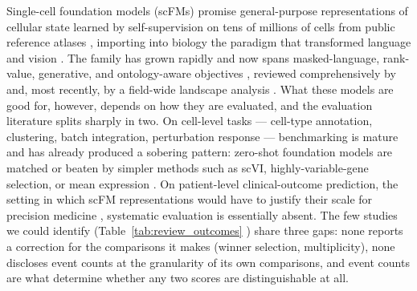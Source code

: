 \documentclass[11pt,a4paper]{article}
\begin{document}
Single-cell foundation models (scFMs) promise general-purpose representations
of cellular state learned by self-supervision on tens of millions of cells
from public reference atlases \citep{cui2024scgpt, theodoris2023geneformer,
regev2017hca, tabula2022sapiens, czi2025cellxgene}, importing into biology the
paradigm that transformed language and vision \citep{bommasani2021foundation,
moor2023generalist, bunne2024virtualcell}. The family has grown rapidly and
now spans masked-language, rank-value, generative, and ontology-aware
objectives \citep{cui2024scgpt, theodoris2023geneformer, hao2024scfoundation,
wen2024cellplm, rosen2026universal, kalfon2025scprint, adduri2025state,
yang2022scbert, chen2025genept, tejada2025nicheformer},
reviewed comprehensively by \citet{szalata2024transformers} and, most
recently, by a field-wide landscape analysis \citep{jiang2026landscape}. What
these models are good for, however, depends on how they are evaluated, and the
evaluation literature splits sharply in two. On cell-level tasks --- cell-type
annotation, clustering, batch integration, perturbation response ---
benchmarking is mature and has already produced a sobering pattern: zero-shot
foundation models are matched or beaten by simpler methods such as scVI,
highly-variable-gene selection, or mean expression
\citep{kedzierska2025zeroshot, ahlmanneltze2025linear, bendidi2024pca,
luecken2019bestpractices, luecken2022benchmarking, luecken2025openproblems,
csendes2025benchmark, wenteler2025perteval, boiarsky2023deepdive,
denadel2026scaling, liu2026evaluating}. On
patient-level clinical-outcome prediction, the setting in which scFM
representations would have to justify their scale for precision medicine
\citep{jiang2026landscape}, systematic evaluation is essentially absent. The
few studies we could identify (Table~\ref{tab:review_outcomes}
\citep{egsp2026survival, empiricalscfm2025cancer, tissueformer2025covid})
share three gaps: none reports a correction for the comparisons it makes (winner
selection, multiplicity), none discloses event counts at the granularity of
its own comparisons, and event counts are what determine whether any two
scores are distinguishable at all.
\end{document}
